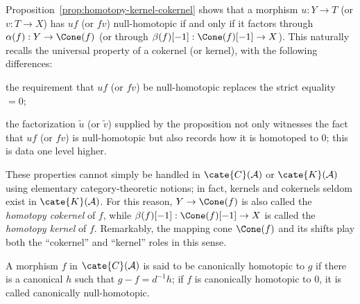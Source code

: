 \begin{remark}\label{rem:homotopy-kernel-cokernel}
	Proposition~\ref{prop:homotopy-kernel-cokernel} shows that a morphism
	$u:Y\to T$ (or $v:T\to X$) has $uf$ (or $fv$) null-homotopic if and only
	if it factors through $\alpha(f):Y\to\Cone(f)$ (or through
	$\beta(f)[-1]:\Cone(f)[-1]\to X$). This naturally recalls the universal
	property of a cokernel (or kernel), with the following differences:
	\begin{compactitem}
		\item the requirement that $uf$ (or $fv$) be null-homotopic replaces
		the strict equality $=0$;
		\item the factorization $\tilde{u}$ (or $\tilde{v}$) supplied by the
		proposition not only witnesses the fact that $uf$ (or $fv$) is
		null-homotopic but also records how it is homotoped to $0$; this is
		data one level higher.
	\end{compactitem}
	These properties cannot simply be handled in $\cate{C}(\mathcal{A})$ or
	$\cate{K}(\mathcal{A})$ using elementary category-theoretic notions; in
	fact, kernels and cokernels seldom exist in $\cate{K}(\mathcal{A})$. For
	this reason, $Y\to\Cone(f)$ is also called the \emph{homotopy cokernel}
	of $f$, while $\beta(f)[-1]:\Cone(f)[-1]\to X$ is called the
	\emph{homotopy kernel} of $f$. Remarkably, the mapping cone $\Cone(f)$
	and its shifts play both the ``cokernel'' and ``kernel'' roles in this
	sense.
\end{remark}

A morphism $f$ in $\cate{C}(\mathcal{A})$ is said to be canonically homotopic
to $g$ if there is a canonical $h$ such that $g-f=d^{-1}h$; if $f$ is
canonically homotopic to $0$, it is called canonically null-homotopic.

